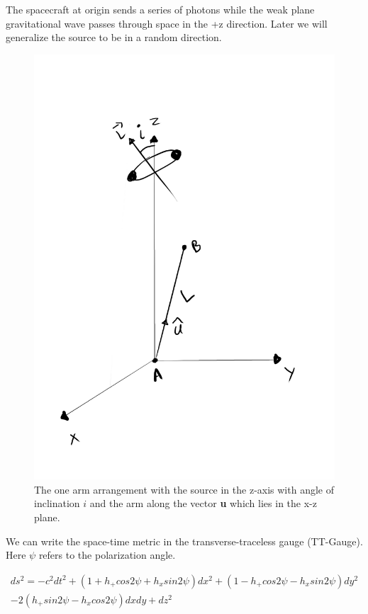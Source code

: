 \documentclass[10pt,a4paper]{article}
\begin{document}
The spacecraft at origin sends a series of photons while the weak plane gravitational wave passes through space in the +z direction. Later we will generalize the source to be in a random direction.

\begin{figure}[!h]
\centering
\includegraphics[scale=0.25]{../Figures/diagram1.jpg}
\caption{The one arm arrangement with the source in the z-axis with angle of inclination $i$ and the arm along the vector \textbf{u} which lies in the x-z plane.}
\end{figure}
We can write the space-time metric in the transverse-traceless gauge (TT-Gauge). Here $\psi$ refers to the polarization angle.

 


\begin{multline}
ds^2 = - c^2 dt^2 + (1+ h_+ cos 2\psi + h_x sin 2 \psi) d x^2 +(1- h_+ cos 2\psi - h_x sin 2 \psi) d y^2 \\
 - 2(h_+ sin 2 \psi - h_x cos 2 \psi) dx dy + dz^2
\end{multline}
\end{document}
